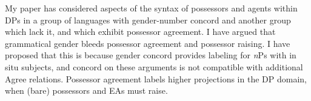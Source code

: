 \documentclass[output=paper
,modfonts
,nonflat]{langsci/langscibook}
\begin{document}
My paper has considered aspects of the syntax of possessors and agents within DPs in a group of languages with gender-number concord and another group which lack it, and which exhibit possessor agreement. I have argued that grammatical gender bleeds possessor agreement and possessor raising. I have proposed that this is because gender concord provides labeling for \textit{n}Ps with in situ subjects, and concord on these arguments is not compatible with additional Agree relations. Possessor agreement labels higher projections in the DP domain, when (bare) possessors and EAs must raise.

\sloppy
\printbibliography[heading=subbibliography,notkeyword=this]
\end{document}
